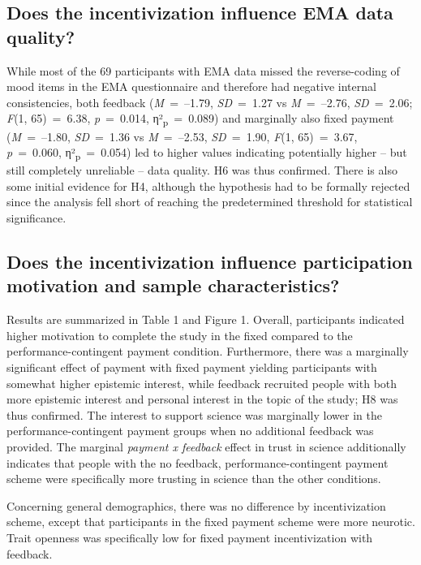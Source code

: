\documentclass[authordate, empirical,issue]{jote-new-article}
\begin{document}
\subsection{Does the incentivization influence EMA data quality?}



While most of the 69 participants with EMA data missed the reverse-coding of mood items in the EMA questionnaire and therefore had negative internal consistencies, both feedback (\emph{M }= --1.79, \emph{SD }= 1.27 vs \emph{M }= --2.76, \emph{SD }= 2.06; \emph{F}(1, 65) = 6.38, \emph{p} = 0.014, η²\textsubscript{p} = 0.089) and marginally also fixed payment (\emph{M }= --1.80, \emph{SD }= 1.36 vs \emph{M }= --2.53, \emph{SD }= 1.90, \emph{F}(1, 65) = 3.67, \emph{p} = 0.060, η²\textsubscript{p} = 0.054) led to higher values indicating potentially higher -- but still completely unreliable -- data quality. H6 was thus confirmed. There is also some initial evidence for H4, although the hypothesis had to be formally rejected since the analysis fell short of reaching the predetermined threshold for statistical significance.



\subsection{Does the incentivization influence participation motivation and sample characteristics?}



Results are summarized in Table 1 and Figure 1. Overall, participants indicated higher motivation to complete the study in the fixed compared to the performance-contingent payment condition. Furthermore, there was a marginally significant effect of payment with fixed payment yielding participants with somewhat higher epistemic interest, while feedback recruited people with both more epistemic interest and personal interest in the topic of the study; H8 was thus confirmed. The interest to support science was marginally lower in the performance-contingent payment groups when no additional feedback was provided. The marginal \emph{payment x feedback }effect in trust in science additionally indicates that people with the no feedback, performance-contingent payment scheme were specifically more trusting in science than the other conditions.



Concerning general demographics, there was no difference by incentivization scheme, except that participants in the fixed payment scheme were more neurotic. Trait openness was specifically low for fixed payment incentivization with feedback.
\end{document}
